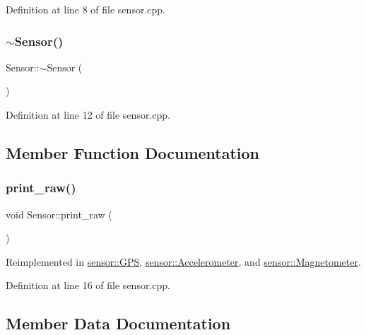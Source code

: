 Definition at line 8 of file sensor.\+cpp.

\mbox{\label{class_sensor_aee8c70e7ef05ce65e7ee33686b5d7db2}} 
\subsubsection{\texorpdfstring{$\sim$\+Sensor()}{~Sensor()}}
{\footnotesize\ttfamily Sensor\+::$\sim$\+Sensor (\begin{DoxyParamCaption}{ }\end{DoxyParamCaption})}



Definition at line 12 of file sensor.\+cpp.



\subsection{Member Function Documentation}
\mbox{\label{class_sensor_a6f16371eb71419f49ea1363ca81d0755}} 
\subsubsection{\texorpdfstring{print\+\_\+raw()}{print\_raw()}}
{\footnotesize\ttfamily void Sensor\+::print\+\_\+raw (\begin{DoxyParamCaption}{ }\end{DoxyParamCaption})\hspace{0.3cm}{\ttfamily [virtual]}}



Reimplemented in \hyperlink{classsensor_1_1_g_p_s_a8b0dfe608735ccca47bae8e9a41e1298}{sensor\+::\+G\+PS}, \hyperlink{classsensor_1_1_accelerometer_a172c1bfe5d20071d5f3542a717797afa}{sensor\+::\+Accelerometer}, and \hyperlink{classsensor_1_1_magnetometer_a808eda46aabd080426c909563da0f425}{sensor\+::\+Magnetometer}.



Definition at line 16 of file sensor.\+cpp.



\subsection{Member Data Documentation}
\mbox{\label{class_sensor_a67c286c0fd237d5acda6a5b4b99d8aad}} 
